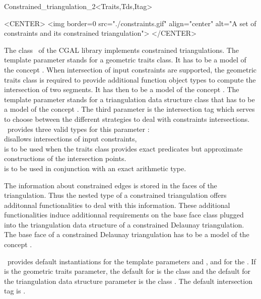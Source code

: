 \begin{ccRefClass}{Constrained_triangulation_2<Traits,Tds,Itag>}
\begin{ccHtmlOnly}
<CENTER>
<img border=0 src="./constraints.gif" align="center" alt="A set of
constraints and its constrained triangulation">
</CENTER>
\end{ccHtmlOnly}

The class \ccRefName\ of the CGAL library
implements constrained triangulations.
The template parameter  
stands for a geometric traits class. It has to be a model
of the concept .
When intersection of input constraints are supported, 
the geometric traits class 
is required to provide additional function object  types
to compute the intersection of two segments.
It has then to be a model of the concept
.
The template parameter 
stands for 
a triangulation data structure class that has to be a model
of the concept .
The third parameter  is the intersection tag
which serves  to choose between the different
strategies to deal with constraints intersections. 
\cgal\ provides three valid types for this parameter : \\
 disallows intersections of
 input constraints,\\
 is to be used when the traits
class
provides exact predicates but approximate constructions of the
intersection points.\\
 is to be used in conjunction
with an exact arithmetic type.

 The information about constrained edges is stored in the 
faces of the triangulation. Thus the nested 
type of a constrained triangulation offers
additonnal functionalities to deal with this information.
These additional functionalities 
induce additionnal requirements on the base face class
plugged into the triangulation data structure of 
 a constrained Delaunay triangulation.
The base face of a constrained Delaunay triangulation
has to be a model of the concept
.

\cgal\ provides  default instantiations for the template parameters
 and , and for the .
 If  is the geometric traits
parameter,
the default  for
  is the class
and the default for the
triangulation data structure parameter is the class
.
The default intersection tag is .


\end{ccRefClass}
